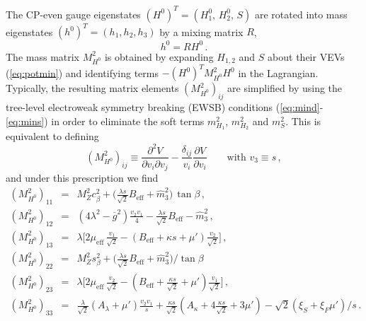 \documentclass[final,3p,times,pdflatex]{elsarticle}
\newcommand{\be}{\begin{equation}}
\newcommand{\ee}{\end{equation}}
\newcommand{\ba}{\begin{eqnarray}}
\newcommand{\ea}{\end{eqnarray}}
\newcommand{\ds}{\displaystyle}
\begin{document}
The CP-even gauge eigenstates $(H^0)^T = (H_1^0,\, H_2^0, \, S)$ are rotated into
 mass eigenstates $(h^0)^T = (h_1, h_2, h_3)$ by a mixing matrix $R$,
%
\be 
h^0 = R H^0\,. 
\ee 
%
The mass matrix $M^2_{H^0}$ is obtained by expanding $H_{1,2}$ and $S$ about their 
VEVs (\ref{eq:potmin}) and identifying terms $-(H^0)^T M^2_{H^0} H^0$ in the Lagrangian.  
Typically, the resulting matrix elements $(M_{H^0}^2)_{ij}$ are simplified by using the 
tree-level electroweak symmetry breaking (EWSB) conditions (\ref{eq:mind}-\ref{eq:mins}) 
in order to eliminate the soft terms $m_{H_1}^2$, $m_{H_2}^2$ and $m_S^2$.  This is 
equivalent to defining  
%
\be
(M_{H^0}^2)_{ij} \equiv  \ds\frac{\partial^2 V}{\partial v_i \partial v_j} 
- \ds\frac{\delta_{ij}}{v_i}\ds\frac{\partial V}{\partial v_i} \qquad \mbox{with } v_3\equiv s\,,
\ee
%
and under this prescription we find    
%
\ba
 (M_{H^0}^2)_{11} & = & M_Z^2 c_\beta^2 
 + \Bigg(\ds\frac{\lambda s}{\sqrt{2}} B_\textrm{eff} +
 \widehat{m}_3^2\Bigg)\,\tan\beta\,,\\
 (M_{H^0}^2)_{12} & = & (4\lambda^2 - \overline{g}^2) \ds\frac{v_2 v_1 }{4}- 
 \ds\frac{\lambda s}{\sqrt{2}} B_\textrm{eff} - \widehat{m}_3^2\,, \\ 
 (M_{H^0}^2)_{13} & = & \lambda \Bigg[2 \mu_\textrm{eff}\,\ds\frac{ v_1}{\sqrt{2}} -
 (B_\textrm{eff} + \kappa s + \mu')\ds\frac{ v_2}{\sqrt{2}}\Bigg]\,,\\
 (M_{H^0}^2)_{22} & = & M_Z^2 s_\beta^2 + \Bigg(\ds\frac{\lambda s}{\sqrt{2}} B_\textrm{eff} +
\widehat{m}_3^2\Bigg)/\tan\beta\, \\
 (M_{H^0}^2)_{23} & = & \lambda \Bigg[2 \mu_\textrm{eff}\, \ds\frac{ v_2}{\sqrt{2}} -
(B_\textrm{eff} + \frac{\kappa s}{\sqrt{2}} + \mu')\ds\frac{ v_1}{\sqrt{2}}\Bigg]\,, \\
 (M_{H^0}^2)_{33} & = & \ds\frac{\lambda}{\sqrt{2}} (A_\lambda + \mu') \frac{v_2 v_1}{s}
+ \frac{\kappa s}{\sqrt{2}} (A_\kappa + 4\frac{\kappa s}{\sqrt{2}}+ 3 \mu') - \sqrt{2}(\xi_S + \xi_F \mu')/s\,.
\label{eq:MH0}
\ea
\end{document}
